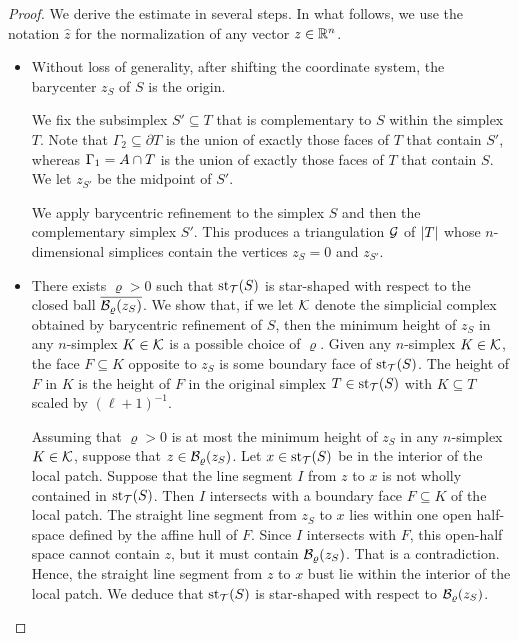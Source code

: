 \documentclass[10pt,a4paper]{article}
\begin{document}
\begin{proof}
    We derive the estimate in several steps. 
    In what follows, we use the notation $\hat z$ for the normalization of any vector $z \in {\mathbb R}^{n}$.
    \begin{itemize}
        \item 
        Without loss of generality, after shifting the coordinate system, the barycenter $z_{S}$ of $S$ is the origin. 
        
        We fix the subsimplex $S' \subseteq T$ that is complementary to $S$ within the simplex $T$.
        Note that ${\Gamma_2} \subseteq \partial T$ is the union of exactly those faces of $T$ that contain $S'$,
        whereas ${\Gamma_1} = A \cap T$ is the union of exactly those faces of $T$ that contain $S$. 
        We let $z_{S'}$ be the midpoint of $S'$. 
        
        We apply barycentric refinement to the simplex $S$ and then the complementary simplex $S'$.
        This produces a triangulation ${\mathcal G}$ of $\left| T \right|$ whose $n$-dimensional simplices contain the vertices $z_{S} = 0$ and $z_{S'}$.
        
        \item 
        There exists $\varrho > 0$ such that $\operatorname{st}_{{\mathcal T}}(S)$ is star-shaped with respect to the closed ball $\overline{{\mathcal B}_{\varrho}(z_S)}$.
        We show that, if we let ${\mathcal K}$ denote the simplicial complex obtained by barycentric refinement of $S$,
        then the minimum height of $z_{S}$ in any $n$-simplex $K \in {\mathcal K}$ is a possible choice of $\varrho$.
        Given any $n$-simplex $K \in {\mathcal K}$, the face $F \subseteq K$ opposite to $z_{S}$ is some boundary face of $\operatorname{st}_{{\mathcal T}}(S)$.
        The height of $F$ in $K$ is the height of $F$ in the original simplex $T \in \operatorname{st}_{{\mathcal T}}(S)$ with $K \subseteq T$ scaled by $(\ell+1)^{-1}$.
        
        Assuming that $\varrho > 0$ is at most the minimum height of $z_{S}$ in any $n$-simplex $K \in {\mathcal K}$,
        suppose that $z \in {\mathcal B}_{\varrho}(z_S)$. 
        Let $x \in \operatorname{st}_{{\mathcal T}}(S)$ be in the interior of the local patch. 
        Suppose that the line segment $I$ from $z$ to $x$ is not wholly contained in $\operatorname{st}_{{\mathcal T}}(S)$. 
        Then $I$ intersects with a boundary face $F \subseteq K$ of the local patch.
        The straight line segment from $z_{S}$ to $x$ lies within one open half-space defined by the affine hull of $F$.
        Since $I$ intersects with $F$, this open-half space cannot contain $z$, but it must contain ${\mathcal B}_{\varrho}(z_S)$.
        That is a contradiction. Hence, the straight line segment from $z$ to $x$ bust lie within the interior of the local patch. 
        We deduce that $\operatorname{st}_{{\mathcal T}}(S)$ is star-shaped with respect to ${\mathcal B}_{\varrho}(z_S)$.
        

\end{itemize}
\end{proof}
\end{document}
